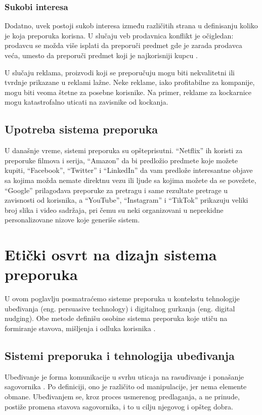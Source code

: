 \documentclass[a4paper]{article}
\begin{document}
\subsubsection{Sukobi interesa}
\label{subsubsec:sukobi_interesa}

Dodatno, uvek postoji sukob interesa između različitih strana u definisanju koliko je koja preporuka korisna. U slučaju veb prodavnica konflikt je očigledan: prodavcu se možda više isplati da preporuči predmet gde je zarada prodavca veća, umesto da preporuči predmet koji je najkorisniji kupcu \cite{burke_recommender_2011}.

U slučaju reklama, proizvodi koji se preporučuju mogu biti nekvalitetni ili tvrdnje prikazane u reklami lažne. Neke reklame, iako profitabilne za kompanije, mogu biti veoma štetne za posebne korisnike. Na primer, reklame za kockarnice mogu katastrofalno uticati na zavisnike od kockanja.

\subsection{Upotreba sistema preporuka}
\label{subsec:upotreba_sistema_preporuka}

U današnje vreme, sistemi preporuka su opšteprisutni. ``Netflix'' ih koristi za preporuke filmova i serija, ``Amazon'' da bi predložio predmete koje možete kupiti, ``Facebook'', ``Twitter'' i ``LinkedIn'' da vam predlože interesantne objave sa kojima možda nemate direktnu vezu ili ljude sa kojima možete da se povežete, ``Google'' prilagođava preporuke za pretragu i same rezultate pretrage u zavisnosti od korisnika, a ``YouTube'', ``Instagram'' i ``TikTok'' prikazuju veliki broj slika i video sadržaja, pri čemu su neki organizovani u neprekidne personalizovane nizove koje generiše sistem.

\section{Etički osvrt na dizajn sistema preporuka}
U ovom poglavlju posmatraćemo sisteme preporuka u kontekstu tehnologije ubeđivanja (eng. persuasive technology) i digitalnog gurkanja (eng. digital nudging). Obe metode definišu osobine sistema preporuka koje utiču na formiranje stavova, mišljenja i odluka korisnika \cite{Jesse_Jannach_2021}.

\subsection{Sistemi preporuka i tehnologija ubeđivanja}
Ubeđivanje je forma komunikacije u svrhu uticaja na rasuđivanje i ponašanje sagovornika \cite{Simons_Jones_2011}. Po definiciji, ono je različito od manipulacije, jer nema elemente obmane. Ubeđivanjem se, kroz proces usmerenog predlaganja, a ne prinude, postiže promena stavova sagovornika, i to u cilju njegovog i opšteg dobra. 
\end{document}
